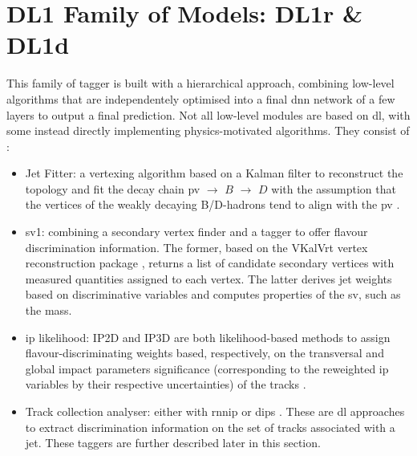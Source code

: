 \section{DL1 Family of Models: DL1r \& DL1d}
This family of tagger is built with a hierarchical approach, combining low-level algorithms that are independentely optimised into a final \gls{dnn} network of a few layers to output a final prediction. Not all low-level modules are based on \gls{dl}, with some instead directly implementing physics-motivated algorithms. They consist of \cite{Paganini:2289214}:
\begin{itemize}
\item Jet Fitter: a vertexing algorithm based on a Kalman filter to reconstruct the topology and fit the decay chain \gls{pv} $\rightarrow$ $B$ $\rightarrow$ $D$ with the assumption that the vertices of the weakly decaying B/D-hadrons tend to align with the \gls{pv} \cite{ATL-PHYS-PUB-2018-025}. 
\item \gls{sv1}: combining a secondary vertex finder and a tagger to offer flavour discrimination information. The former, based on the VKalVrt vertex reconstruction package \cite{Kostyukhin:685551}, returns a list of candidate secondary vertices with measured quantities assigned to each vertex. The latter derives jet weights based on discriminative variables and computes properties of the \gls{sv}, such as the mass. 
\item \gls{ip} likelihood: IP2D and IP3D are both likelihood-based methods to assign flavour-discriminating weights based, respectively, on the transversal and global impact parameters significance (corresponding to the reweighted \gls{ip} variables by their respective uncertainties) of the tracks \cite{ATLAS:2017bcq}. 
\item Track collection analyser: either with \gls{rnnip} \cite{ATL-PHYS-PUB-2017-003} or \gls{dips} \cite{ATL-PHYS-PUB-2020-014}. These are \gls{dl} approaches to extract discrimination information on the set of tracks associated with a jet. These taggers are further described later in this section.  
\end{itemize}

